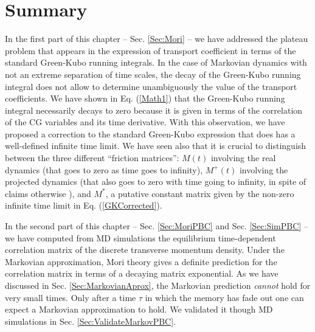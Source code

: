 \documentclass[b5paper,openright,11pt]{book}
\begin{document}
\newpage
\section{Summary}
\label{Sec:SummaryChapPBC}
In the first part of this chapter -- Sec. \ref{Sec:Mori} -- we have addressed  the plateau problem that  appears in
the  expression of  transport  coefficient in  terms  of the  standard
Green-Kubo running integrals.  In the  case of Markovian dynamics with
not an extreme separation of time  scales, the decay of the Green-Kubo
running integral does  not allow to determine  unambiguously the value
of the  transport coefficients.  We  have shown in  Eq.  (\ref{Math1})
that  the  Green-Kubo  running  integral necessarily  decays  to  zero
because it  is given in terms  of the correlation of  the CG variables
and its  time derivative.  With  this observation, we have  proposed a
correction  to  the  standard  Green-Kubo  expression  that  does  has  a
well-defined infinite time limit. We have seen also that it is crucial
to  distinguish between  the  three  different ``friction  matrices'':
$M(t)$ involving the real dynamics (that  goes to zero as time goes to
infinity), $M^+(t)$  involving the projected dynamics  (that also goes
to zero  with time  going to  infinity, in  spite of  claims otherwise
\cite{Kubo1991,Espanol1993}),  and $M^*$,  a putative  constant
matrix   given    by   the    non-zero   infinite   time    limit   in
Eq. (\ref{GKCorrected}).


In the second part of this chapter -- Sec. \ref{Sec:MoriPBC} and Sec. \ref{Sec:SimPBC} --  we  have computed from  MD simulations  the equilibrium
time-dependent correlation matrix of  the discrete transverse momentum
density.   Under  the Markovian  approximation,  Mori  theory gives  a
definite prediction for the correlation  matrix in terms of a decaying
matrix exponential.   As we  have discussed in Sec. \ref{Sec:MarkovianAprox}, the  Markovian prediction
\textit{cannot}  hold for  very small  times. Only after a time $\tau$ in which the memory
has fade out one can expect a Markovian approximation to hold. We validated it though MD simulations in Sec. \ref{Sec:ValidateMarkovPBC}.
\end{document}
